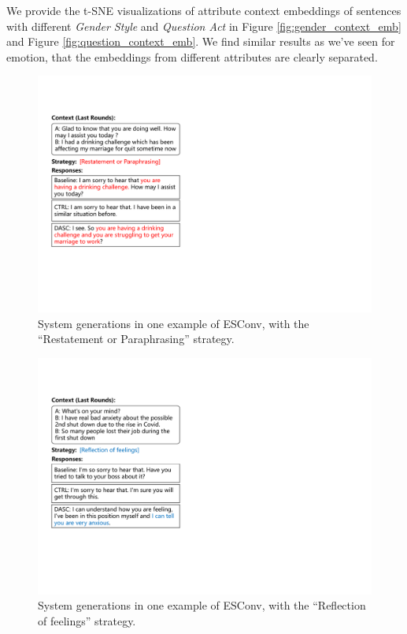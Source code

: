 We provide the t-SNE visualizations of attribute context embeddings of sentences with different \textit{Gender Style} and \textit{Question Act} in Figure \ref{fig:gender_context_emb} and Figure \ref{fig:question_context_emb}. We find similar results as we've seen for emotion, that the embeddings from different attributes are clearly separated.

\begin{figure}[htbp]
    \centering
    \includegraphics[width=1.0\columnwidth]{figures/esconv_example1.pdf}
    \caption{System generations in one example of ESConv, with the ``Restatement or Paraphrasing'' strategy.}
    \label{fig:esconv_example1}
\end{figure}

\begin{figure}[htbp]
    \centering
    \includegraphics[width=1.0\columnwidth]{figures/esconv_example2.pdf}
    \caption{System generations in one example of ESConv, with the ``Reflection of feelings'' strategy.}
    \label{fig:esconv_example2}
\end{figure}

